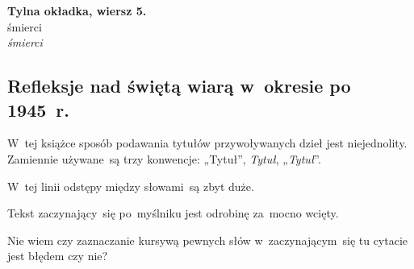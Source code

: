 \documentclass[a4paper,11pt]{article}
\begin{document}
\vspace{\spaceTwo}


\noindent
\textbf{Tylna okładka, wiersz 5.} \\
\Jest  śmierci \\
\Powin \textit{śmierci} \\








\subsection{Refleksje nad świętą wiarą w~okresie po 1945~r.}

\vspace{\spaceThree}



{}

\vspace{0em}



\vspace{0em}


\noindent
W~tej książce sposób podawania tytułów przywoływanych dzieł
jest niejednolity. Zamiennie używane~są trzy konwencje: „Tytuł”,
\textit{Tytuł}, „\textit{Tytuł}”.

\vspace{\spaceFour}





 W~tej linii odstępy między słowami~są zbyt duże.

\vspace{\spaceFour}





 Tekst zaczynający~się po~myślniku jest odrobinę za~mocno
wcięty.

\vspace{\spaceFour}





 Nie wiem czy zaznaczanie kursywą pewnych słów
w~zaczynającym~się tu cytacie jest błędem czy nie?
\end{document}
